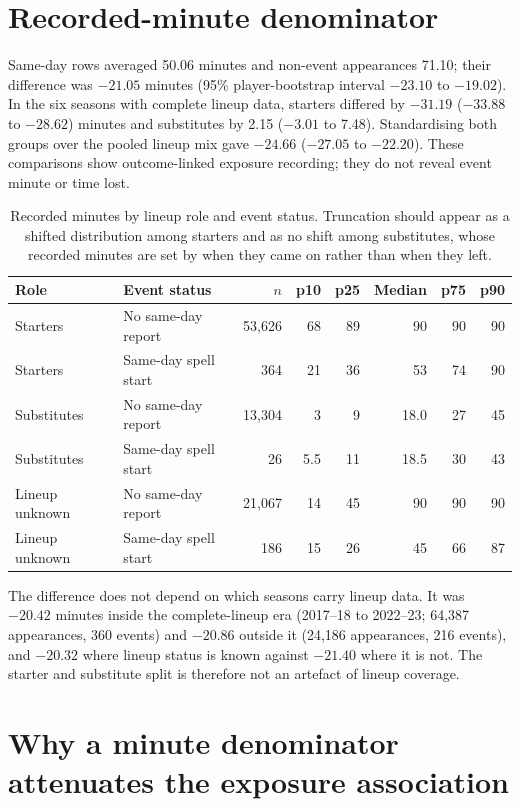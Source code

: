 \documentclass[11pt]{article}
\begin{document}
\section{Recorded-minute denominator}

Same-day rows averaged 50.06 minutes and non-event appearances 71.10; their difference was $-21.05$ minutes (95\% player-bootstrap interval $-23.10$ to $-19.02$). In the six seasons with complete lineup data, starters differed by $-31.19$ ($-33.88$ to $-28.62$) minutes and substitutes by 2.15 ($-3.01$ to 7.48). Standardising both groups over the pooled lineup mix gave $-24.66$ ($-27.05$ to $-22.20$). These comparisons show outcome-linked exposure recording; they do not reveal event minute or time lost.

\begin{table}[h]
\centering
\caption{Recorded minutes by lineup role and event status. Truncation should appear as a shifted distribution among starters and as no shift among substitutes, whose recorded minutes are set by when they came on rather than when they left.}
\label{tab:supp_minute_distribution}
\small
\begin{tabular}{llrrrrrr}
\toprule
Role & Event status & $n$ & p10 & p25 & Median & p75 & p90\\
\midrule
Starters & No same-day report & 53,626 & 68 & 89 & 90 & 90 & 90\\
Starters & Same-day spell start & 364 & 21 & 36 & 53 & 74 & 90\\
Substitutes & No same-day report & 13,304 & 3 & 9 & 18.0 & 27 & 45\\
Substitutes & Same-day spell start & 26 & 5.5 & 11 & 18.5 & 30 & 43\\
Lineup unknown & No same-day report & 21,067 & 14 & 45 & 90 & 90 & 90\\
Lineup unknown & Same-day spell start & 186 & 15 & 26 & 45 & 66 & 87\\
\bottomrule
\end{tabular}
\end{table}

The difference does not depend on which seasons carry lineup data. It was $-20.42$ minutes inside the complete-lineup era (2017--18 to 2022--23; 64,387 appearances, 360 events) and $-20.86$ outside it (24,186 appearances, 216 events), and $-20.32$ where lineup status is known against $-21.40$ where it is not. The starter and substitute split is therefore not an artefact of lineup coverage.

\section{Why a minute denominator attenuates the exposure association}
\end{document}
